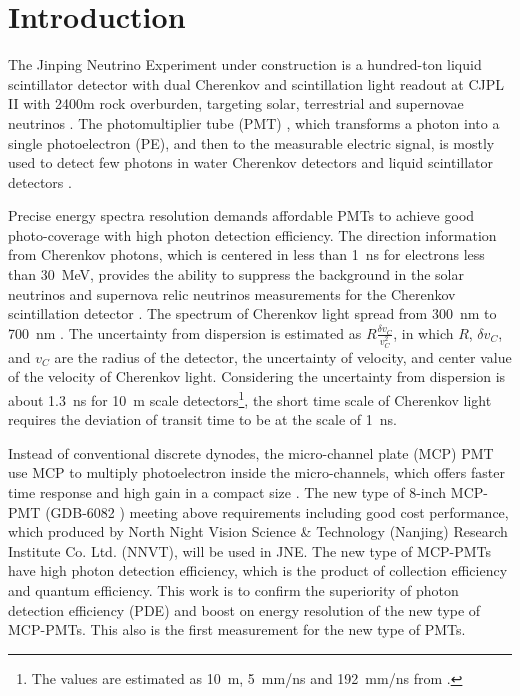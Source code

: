 \section{Introduction}
The Jinping Neutrino Experiment under construction is a hundred-ton liquid scintillator detector with dual Cherenkov and scintillation light readout
 at CJPL II with 2400m rock overburden, targeting solar, terrestrial and supernovae neutrinos \cite{LetterJNE2017}. %
The photomultiplier tube (PMT) \cite{HAMAMATSUManual}, which transforms a photon into a single photoelectron (PE), and then to the measurable electric signal, is mostly used to detect few photons in water Cherenkov detectors \cite{SNO,SuperK} and liquid scintillator detectors \cite{KamLAND,JUNO:2015zny}.

Precise energy spectra resolution demands affordable PMTs to achieve good photo-coverage with high photon detection efficiency. The direction information from Cherenkov photons, which is centered in less than \SI{1}{ns} for electrons less than \SI{30}{MeV}, provides the ability to suppress the background in the solar neutrinos and supernova relic neutrinos measurements for the Cherenkov scintillation detector \cite{Guo_2019}. The spectrum of Cherenkov light spread from \SI{300}{nm} to \SI{700}{nm} \cite{Luo:2022xrd}. The uncertainty from dispersion is estimated as $R\frac{\delta v_C}{v_C^2}$, in which $R$, $\delta v_C$, and $v_C$ are the radius of the detector, the uncertainty of velocity, and center value of the velocity of Cherenkov light. Considering the uncertainty from dispersion is about \SI{1.3}{ns} for \SI{10}{m} scale detectors\footnote{The values are estimated as \SI{10}{m}, \SI{5}{mm/ns} and \SI{192}{mm/ns} from \cite{Luo:2022xrd}.}, the short time scale of Cherenkov light requires the deviation of transit time to be at the scale of \SI{1}{ns}.

Instead of conventional discrete dynodes, the micro-channel plate (MCP) PMT use MCP to multiply photoelectron inside the micro-channels, which offers faster time response and high gain in a compact size \cite{HAMAMATSUManual}. The new type of 8-inch MCP-PMT (GDB-6082 \cite{GDB-6082}) meeting above requirements including good cost performance, which produced by North Night Vision Science \& Technology (Nanjing) Research Institute Co. Ltd. (NNVT), will be used in JNE. The new type of MCP-PMTs have high photon detection efficiency, which is the product of collection efficiency and quantum efficiency. This work is to confirm the superiority of photon detection efficiency (PDE) and boost on energy resolution of the new type of MCP-PMTs. This also is the first measurement for the new type of PMTs.

